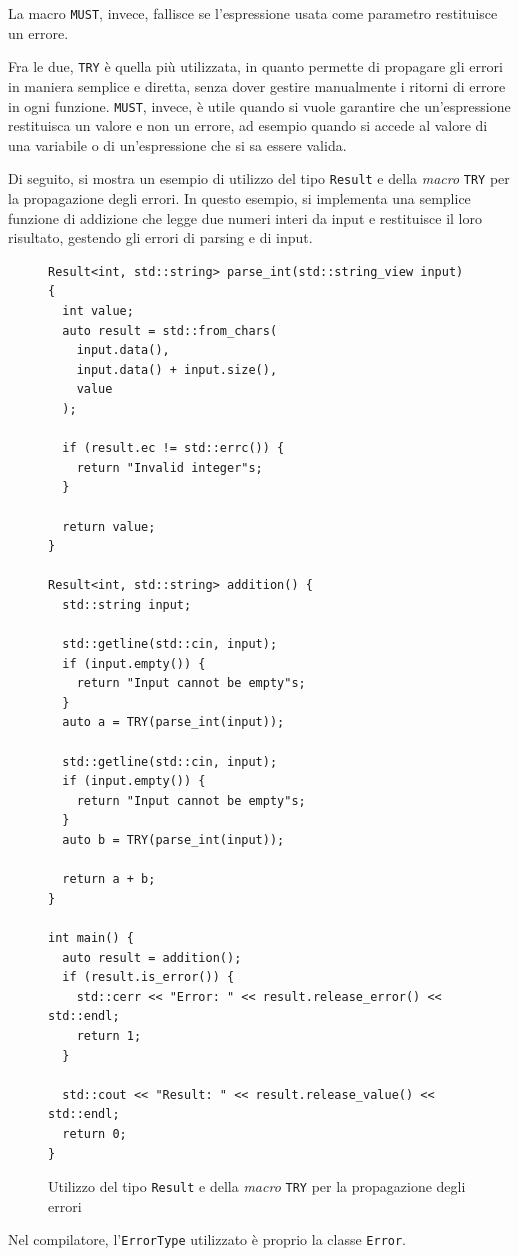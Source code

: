 La macro \texttt{MUST}, invece, fallisce se l'espressione usata come parametro restituisce un errore.

Fra le due, \texttt{TRY} \`e quella pi\`u utilizzata, in quanto permette di propagare gli errori in maniera semplice e diretta, senza dover gestire manualmente i ritorni di errore in ogni funzione. \texttt{MUST}, invece, \`e utile quando si vuole garantire che un'espressione restituisca un valore e non un errore, ad esempio quando si accede al valore di una variabile o di un'espressione che si sa essere valida.

Di seguito, si mostra un esempio di utilizzo del tipo \texttt{Result} e della \textit{macro} \texttt{TRY} per la propagazione degli errori. In questo esempio, si implementa una semplice funzione di addizione che legge due numeri interi da input e restituisce il loro risultato, gestendo gli errori di parsing e di input.

\begin{figure}[H]
	\centering
	\begin{verbatim}
Result<int, std::string> parse_int(std::string_view input) {
  int value;
  auto result = std::from_chars(
    input.data(),
    input.data() + input.size(),
    value
  );

  if (result.ec != std::errc()) {
    return "Invalid integer"s;
  }

  return value;
}

Result<int, std::string> addition() {
  std::string input;

  std::getline(std::cin, input);
  if (input.empty()) {
    return "Input cannot be empty"s;
  }
  auto a = TRY(parse_int(input));

  std::getline(std::cin, input);
  if (input.empty()) {
    return "Input cannot be empty"s;
  }
  auto b = TRY(parse_int(input));

  return a + b;
}

int main() {
  auto result = addition();
  if (result.is_error()) {
    std::cerr << "Error: " << result.release_error() << std::endl;
    return 1;
  }

  std::cout << "Result: " << result.release_value() << std::endl;
  return 0;
}
	\end{verbatim}
	\label{fig:result-usage-example}
	\caption{Utilizzo del tipo \texttt{Result} e della \textit{macro} \texttt{TRY} per la propagazione degli errori}
\end{figure}

Nel compilatore, l'\texttt{ErrorType} utilizzato \`e proprio la classe \texttt{Error}.

